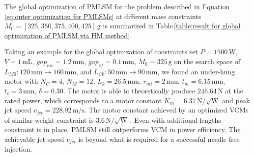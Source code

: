             
        The global optimization of \acs{PMLSM} for the problem described in Equation\,\ref{eq:outer optimization for PMLSMs} at different mass constraints $M_0=[325,350,375,400,425]\,\mathrm{g}$ is summarized in Table\,\ref{table:result for global optimization of PMLSM via HM method}.
            
            
        Taking an example for the global optimization of constraints set $P=1500\,\mathrm{W}$, $V=1\,\mathrm{mL}$, $gap_{mc}=1.2\,\mathrm{mm}$, $gap_{cf}=0.1\,\mathrm{mm}$, $M_0=325\,\mathrm{g}$ on the search space of $L_{M0}:120\,\mathrm{mm}\rightarrow 160\,\mathrm{mm}$, and $L_{C0}:50\,\mathrm{mm}\rightarrow 90\,\mathrm{mm}$, we found an under-hung motor with $N_C=4$, $N_M=12$, $L_k=26.5\,\mathrm{mm}$, $r_{mi}=2\,\mathrm{mm}$, $t_m=6.15\,\mathrm{mm}$, $t_c=3\,\mathrm{mm}$, $\delta=0.30$. The motor is able to theoretically produce $246.64\,\mathrm{N}$ at the rated power, which corresponds to a motor constant $K_m=6.37\,\mathrm{N/\sqrt{W}}$ and peak jet speed $v_{jet}=228.92\,\mathrm{m/s}$. The motor constant achieved by an optimized \acsp{VCM} of similar weight constraint is $3.6\,\mathrm{N/\sqrt{W}}$\,\cite{ruddy2014}. Even with additional lengths constraint is in place, \acs{PMLSM} still outperforms \acs{VCM} in power efficiency. The achievable jet speed $v_{jet}$ is beyond what is required for a successful needle free injection.
            
